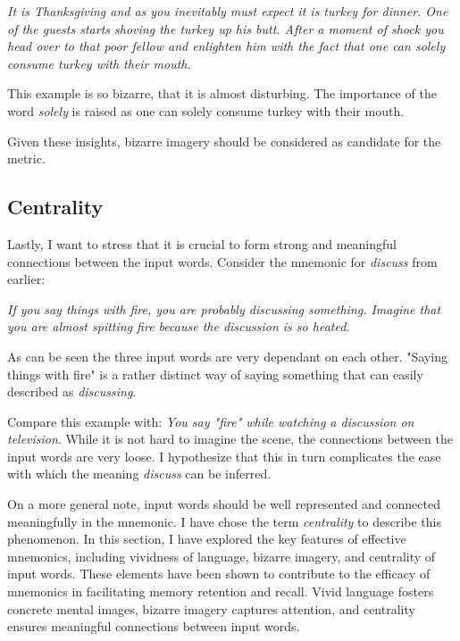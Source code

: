 \emph{It is Thanksgiving and as you inevitably must expect it is turkey for dinner. One of the guests starts shoving the turkey up his butt. After a moment of shock you head over to that poor fellow and  enlighten him with the fact that one can solely consume turkey with their mouth.}

This example is so bizarre, that it is almost disturbing. The importance of the word \emph{solely} is raised as one can solely consume turkey with their mouth. 

Given these insights, bizarre imagery should be considered as candidate for the metric.

\subsection{Centrality}
Lastly, I want to stress that it is crucial to form strong and meaningful connections between the input words. Consider the mnemonic for \emph{discuss} from earlier:

\emph{If you say things with fire, you are probably discussing something. Imagine that you are almost spitting fire because the discussion is so heated}.

As can be seen the three input words are very dependant on each other. "Saying things with fire" is a rather distinct way of saying something that can easily described as \emph{discussing}.

Compare this example with: \emph{You say "fire" while watching a discussion on television}. While it is not hard to imagine the scene, the connections between the input words are very loose. I hypothesize that this in turn complicates the ease with which the meaning \emph{discuss} can be inferred.  

On a more general note, input words should be well represented and connected meaningfully in the mnemonic. I have chose the term \emph{centrality} to describe this phenomenon.
\newline
\newline
In this section, I have explored the key features of effective mnemonics, including vividness of language, bizarre imagery, and centrality of input words. These elements have been shown to contribute to the efficacy of mnemonics in facilitating memory retention and recall. Vivid language fosters concrete mental images, bizarre imagery captures attention, and centrality ensures meaningful connections between input words.